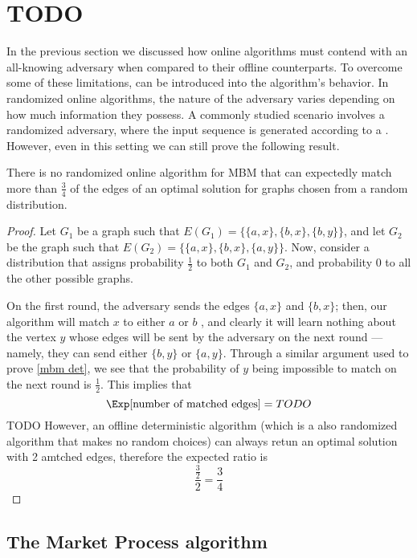 \documentclass[a4paper, 12pt]{report}
\begin{document}
    \section{TODO}

    In the previous section we discussed how  online algorithms must contend with an all-knowing adversary when compared to their offline counterparts. To overcome some of these limitations,  can be introduced into the algorithm's behavior. In randomized online algorithms, the nature of the adversary varies depending on how much information they possess. A commonly studied scenario involves a randomized adversary, where the input sequence is generated according to a . However, even in this setting we can still prove the following result.
    
    \begin{framedthm}{}
        There is no randomized online algorithm for MBM that can expectedly match more than $\tfrac{3}{4}$ of the edges of an optimal solution for graphs chosen from a random distribution.
    \end{framedthm}

    \begin{proof}
        Let $G_1$ be a graph such that $E(G_1) = \{\{a, x\}, \{b, x\}, \{b, y\}\}$, and let $G_2$ be the graph such that $E(G_2) = \{\{a, x\}, \{b, x\}, \{a, y\}\}$. Now, consider a distribution that assigns probability $\tfrac{1}{2}$ to both $G_1$ and $G_2$, and probability 0 to all the other possible graphs.

        On the first round, the adversary sends the edges $\{a, x\}$ and $\{b, x\}$; then, our algorithm will match $x$ to either $a$ or $b$ , and clearly it will learn nothing about the vertex $y$ whose edges will be sent by the adversary on the next round --- namely, they can send either $\{b, y\}$ or $\{a, y\}$. Through a similar argument used to prove \cref{mbm det}, we see that the probability of $y$ being impossible to match on the next round is $\tfrac{1}{2}$. This implies that $$\Exp[\mbox{number of matched edges}] = TODO$$ TODO  However, an offline deterministic algorithm (which is a also randomized algorithm that makes no random choices) can always retun an optimal solution with 2 amtched edges, therefore the expected ratio is $$\dfrac{\tfrac{3}{2}}{2} = \dfrac{3}{4}$$
    \end{proof}

    \subsection{The Market Process algorithm}
\end{document}
